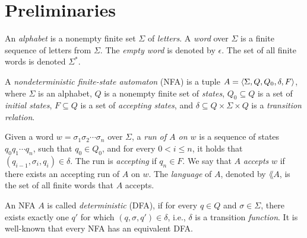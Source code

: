 \section{Preliminaries}

An {\em alphabet} is a nonempty finite set $\Sigma$ of {\em letters}. 
%
A {\em word} over $\Sigma$ is a finite 
sequence of letters from 
$\Sigma$. The {\em empty word} is denoted by $\epsilon$. The set of all finite words is denoted $\Sigma^*$.


\begin{definition}
\label{def:nfa}
A {\em nondeterministic finite-state automaton} (NFA) is a tuple \linebreak $A 
= \langle \Sigma,Q,Q_0,\delta,F \rangle$, where $\Sigma$ is an alphabet, $Q$ is a 
nonempty finite set of {\em states}, $Q_0\subseteq Q$ is a set of {\em initial 
states}, $F\subseteq Q$ is a set of {\em accepting states}, and 
$\delta\subseteq Q\times\Sigma\times Q$ is a {\em transition relation}. 
\end{definition}

Given a word $w=\sigma_1\sigma_2\cdots \sigma_n$ over $\Sigma$, a 
{\em run of $A$ on $w$} is a sequence of states $q_0q_1\cdots q_n$, such 
that $q_0\in Q_0$, and for every $0 < i \leq n$, it holds that 
$(q_{i-1},\sigma_i, q_i)\in \delta$.
%
The run is {\em accepting} if $q_n\in F$. 
We say that $A$ {\em accepts} $w$ if there exists an accepting run of $A$ on $w$. 
%
The {\em language} of $A$, denoted by $\lang{A}$, is the set of all finite words that $A$ accepts.  

An NFA $A$ is called {\em deterministic} (DFA), if for every $q\in Q$ and 
$\sigma\in\Sigma$, there exists exactly one $q'$ for which $(q,\sigma,q')\in 
\delta$, i.e., $\delta$ is a transition {\em function}.
It is well-known that every NFA has an equivalent DFA. 

